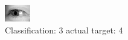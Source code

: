 \begin{figure}[h!]
\begin{center}
\includegraphics[width=0.60\columnwidth]{figures/ID3208_class_3_target_4.png}
\end{center}
\caption{ Classification: 3 actual target: 4}
\label{fig:ID3208_class_3_target_4}
\end{figure}
